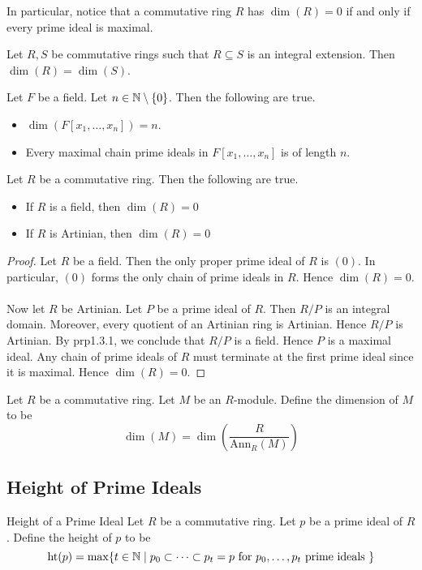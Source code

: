 \documentclass[a4paper]{article}
\begin{document}
In particular, notice that a commutative ring $R$ has $\dim(R)=0$ if and only if every prime ideal is maximal. 

\begin{lmm}{}{} Let $R,S$ be commutative rings such that $R\subseteq S$ is an integral extension. Then $\dim(R)=\dim(S)$. 
\end{lmm}

\begin{prp}{}{} Let $F$ be a field. Let $n\in\mathbb{N}\setminus\{0\}$. Then the following are true. 
\begin{itemize}
\item $\dim(F[x_1,\dots,x_n])=n$. 
\item Every maximal chain prime ideals in $F[x_1,\dots,x_n]$ is of length $n$. 
\end{itemize}
\end{prp}

\begin{lmm}{}{} Let $R$ be a commutative ring. Then the following are true. 
\begin{itemize}
\item If $R$ is a field, then $\dim(R)=0$
\item If $R$ is Artinian, then $\dim(R)=0$
\end{itemize} \tcbline
\begin{proof}
Let $R$ be a field. Then the only proper prime ideal of $R$ is $(0)$. In particular, $(0)$ forms the only chain of prime ideals in $R$. Hence $\dim(R)=0$. \\~\\

Now let $R$ be Artinian. Let $P$ be a prime ideal of $R$. Then $R/P$ is an integral domain. Moreover, every quotient of an Artinian ring is Artinian. Hence $R/P$ is Artinian. By prp1.3.1, we conclude that $R/P$ is a field. Hence $P$ is a maximal ideal. Any chain of prime ideals of $R$ must terminate at the first prime ideal since it is maximal. Hence $\dim(R)=0$. 
\end{proof}
\end{lmm}

\begin{defn}{}{} Let $R$ be a commutative ring. Let $M$ be an $R$-module. Define the dimension of $M$ to be $$\dim(M)=\dim\left(\frac{R}{\text{Ann}_R(M)}\right)$$
\end{defn}

\subsection{Height of Prime Ideals}
\begin{defn}{Height of a Prime Ideal}{} Let $R$ be a commutative ring. Let $p$ be a prime ideal of $R$. Define the height of $p$ to be $$\text{ht}(p)=\max\{t\in\mathbb{N}\;|\;p_0\subset\dots\subset p_t=p\text{ for }p_0,\dots,p_t\text{ prime ideals }\}$$
\end{defn}
\end{document}
